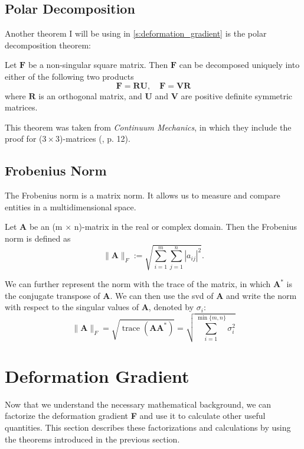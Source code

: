 {\subsection{Polar Decomposition}
Another theorem I will be using in \autoref{s:deformation_gradient} is the polar decomposition theorem:
\begin{theorem}
\label{PD}
Let $\mathbf{F}$ be a non-singular square matrix. Then $\mathbf{F}$ can be decomposed uniquely into either of the following two products
\[
\mathbf{F} = \mathbf{RU}, \quad \mathbf{F} = \mathbf{VR}
\]
where $\mathbf{R}$ is an orthogonal matrix, and $\mathbf{U}$ and $\mathbf{V}$ are positive definite symmetric matrices.
\end{theorem}

This theorem was taken from \textit{Continuum Mechanics}, in which they include the proof for ($3 \times 3$)-matrices (\cite{Spencer1980}, p. 12).

\subsection{Frobenius Norm}
The Frobenius norm is a matrix norm. It allows us to measure and compare entities in a multidimensional space.
\begin{definition}
\label{FN}
Let \textbf{A} be an (m $\times$ n)-matrix in the real or complex domain. Then the Frobenius norm is defined as 
\[
\| \mathbf{A} \|_{F} := \sqrt{\sum\limits_{i=1}^{m} \sum\limits_{j=1}^{n} |a_{ij}|^2}.
\]
\end{definition}
We can further represent the norm with the trace of the matrix, in which $\mathbf{A}^*$ is the conjugate transpose of \textbf{A}. We can then use the \acrshort{svd} of \textbf{A} and write the norm with respect to the singular values of \textbf{A}, denoted by $\sigma_i$:
\begin{equation} \label{eq:FN}
\| \mathbf{A} \|_{F} = \sqrt{\operatorname{trace}(\mathbf{A} \mathbf{A}^*)} = \sqrt{\sum\limits_{i=1}^{\operatorname{min}\{m,n\}} \sigma_i^2}
\end{equation}

\section{Deformation Gradient}
\label{s:deformation_gradient}
Now that we understand the necessary mathematical background, we can factorize the deformation gradient \textbf{F} and use it to calculate other useful quantities. This section describes these factorizations and calculations by using the theorems introduced in the previous section.

}
